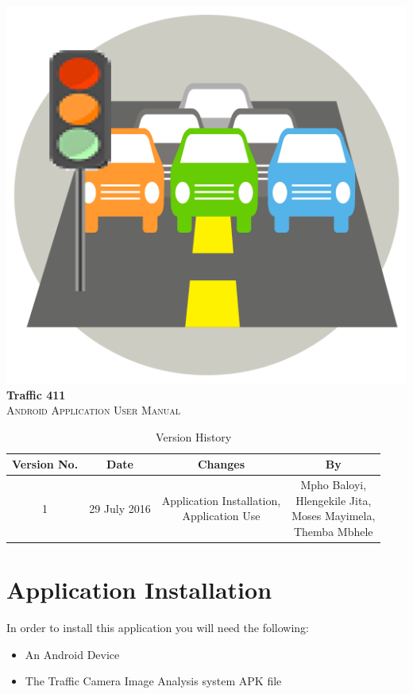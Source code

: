 \documentclass[a4paper,12pt]{article}
\begin{document}
\newpage
\tableofcontents
\newpage
\includegraphics[width=\textwidth]{images/coverPage.png}
\textbf{Traffic 411}\\
\textsc{\large Android Application User Manual}\\[0.5cm]
\newpage
\tableofcontents
\newpage

\newpage
\begin{table}[ht]
 \centering
 \caption{Version History}
 \label{tab:table1}
 \begin{tabular}{cccc}
   \toprule
    Version No. & Date & Changes & By\\
    \midrule
    1 & 29 July 2016 & \makecell{Application Installation, \\ Application Use} & \makecell{Mpho Baloyi,\\ Hlengekile Jita,\\ Moses Mayimela,\\ Themba Mbhele} \\
    \bottomrule
  \end{tabular}
\end{table}
\newpage

\section{Application Installation}
In order to install this application you will need the following:
\begin{itemize}
\item An Android Device
\item The Traffic Camera Image Analysis system APK file
\end{itemize}
\end{document}
